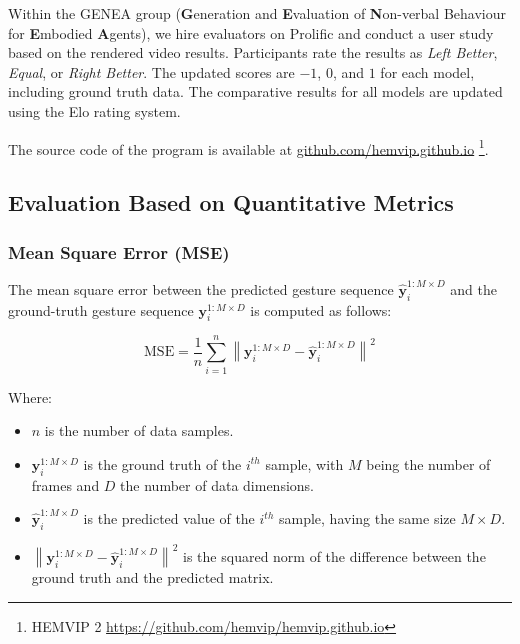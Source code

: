 Within the GENEA group (\textbf{G}eneration and \textbf{E}valuation of \textbf{N}on-verbal Behaviour for \textbf{E}mbodied \textbf{A}gents), we hire evaluators on Prolific and conduct a user study based on the rendered video results. Participants rate the results as \textit{Left Better}, \textit{Equal}, or \textit{Right Better}. The updated scores are $-1$, $0$, and $1$ for each model, including ground truth data. The comparative results for all models are updated using the Elo rating system.

The source code of the program is available at \hyperlink{https://github.com/hemvip/hemvip.github.io/}{github.com/hemvip.github.io}
\footnote{HEMVIP 2 \url{https://github.com/hemvip/hemvip.github.io}}.

\subsection{Evaluation Based on Quantitative Metrics}

\subsubsection{Mean Square Error (MSE)}

The mean square error between the predicted gesture sequence $\hat{\mathbf{y}}_i^{1:M \times D}$ and the ground-truth gesture sequence $\mathbf{y}_i^{1:M \times D}$ is computed as follows:

\begin{equation}
\text{MSE} = \frac{1}{n} \sum_{i=1}^n \left\| \mathbf{y}_i^{1:M \times D} - \hat{\mathbf{y}}_i^{1:M \times D} \right\|^2
\end{equation}

Where:
\begin{itemize}
	\item $n$ is the number of data samples.
	\item $\mathbf{y}_i^{1:M \times D}$ is the ground truth of the $i^{th}$ sample, with $M$ being the number of frames and $D$ the number of data dimensions.
	\item $\hat{\mathbf{y}}_i^{1:M \times D}$ is the predicted value of the $i^{th}$ sample, having the same size $M \times D$.
	\item $\left\| \mathbf{y}_i^{1:M \times D} - \hat{\mathbf{y}}_i^{1:M \times D} \right\|^2$ is the squared norm of the difference between the ground truth and the predicted matrix.
\end{itemize}


